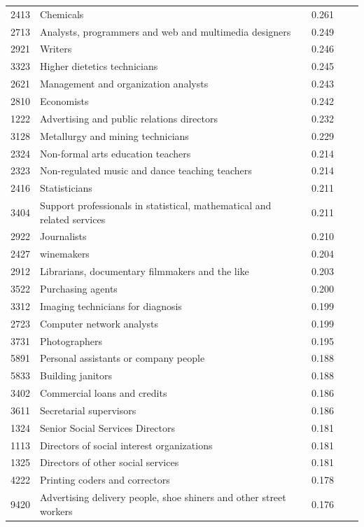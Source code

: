\begin{longtable}{p{}>{\raggedright\arraybackslash}p{}rrr}
2413 & Chemicals & 0.261 & & \\
2713 & Analysts, programmers and web and multimedia designers & 0.249 & & \\
2921 & Writers & 0.246 & & \\
3323 & Higher dietetics technicians & 0.245 & & \\
2621 & Management and organization analysts & 0.243 & & \\
2810 & Economists & 0.242 & & \\
1222 & Advertising and public relations directors & 0.232 & & \\
3128 & Metallurgy and mining technicians & 0.229 & & \\
2324 & Non-formal arts education teachers & 0.214 & & \\
2323 & Non-regulated music and dance teaching teachers & 0.214 & & \\
2416 & Statisticians & 0.211 & & \\
3404 & Support professionals in statistical, mathematical and related services & 0.211 & & \\
2922 & Journalists & 0.210 & & \\
2427 & winemakers & 0.204 & & \\
2912 & Librarians, documentary filmmakers and the like & 0.203 & & \\
3522 & Purchasing agents & 0.200 & & \\
3312 & Imaging technicians for diagnosis & 0.199 & & \\
2723 & Computer network analysts & 0.199 & & \\
3731 & Photographers & 0.195 & & \\
5891 & Personal assistants or company people & 0.188 & & \\
5833 & Building janitors & 0.188 & & \\
3402 & Commercial loans and credits & 0.186 & & \\
3611 & Secretarial supervisors & 0.186 & & \\
1324 & Senior Social Services Directors & 0.181 & & \\
1113 & Directors of social interest organizations & 0.181 & & \\
1325 & Directors of other social services & 0.181 & & \\
4222 & Printing coders and correctors & 0.178 & & \\
9420 & Advertising delivery people, shoe shiners and other street workers & 0.176 & & \\

\end{longtable}
